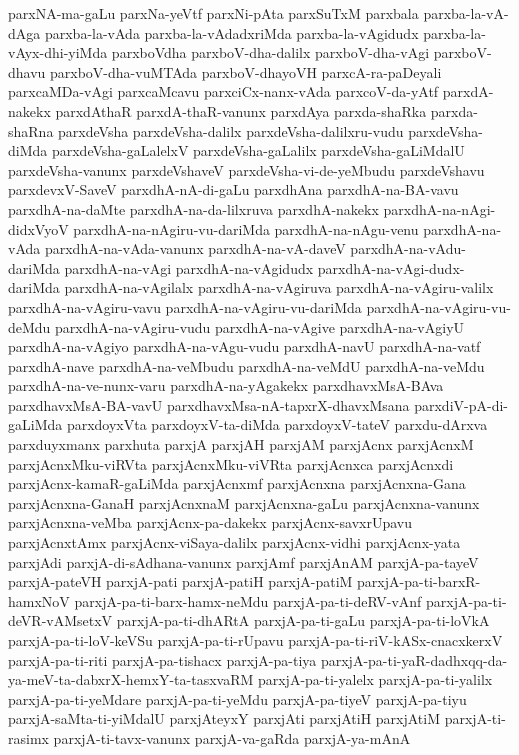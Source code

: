 {parxNA-ma-gaLu
parxNa-yeVtf
parxNi-pAta
parxSuTxM
parxbala
parxba-la-vA-dAga
parxba-la-vAda
parxba-la-vAdadxriMda
parxba-la-vAgidudx
parxba-la-vAyx-dhi-yiMda
parxboVdha
parxboV-dha-dalilx
parxboV-dha-vAgi
parxboV-dhavu
parxboV-dha-vuMTAda
parxboV-dhayoVH
parxcA-ra-paDeyali
parxcaMDa-vAgi
parxcaMcavu
parxciCx-nanx-vAda
parxcoV-da-yAtf
parxdA-nakekx
parxdAthaR
parxdA-thaR-vanunx
parxdAya
parxda-shaRka
parxda-shaRna
parxdeVsha
parxdeVsha-dalilx
parxdeVsha-dalilxru-vudu
parxdeVsha-diMda
parxdeVsha-gaLalelxV
parxdeVsha-gaLalilx
parxdeVsha-gaLiMdalU
parxdeVsha-vanunx
parxdeVshaveV
parxdeVsha-vi-de-yeMbudu
parxdeVshavu
parxdevxV-SaveV
parxdhA-nA-di-gaLu
parxdhAna
parxdhA-na-BA-vavu
parxdhA-na-daMte
parxdhA-na-da-lilxruva
parxdhA-nakekx
parxdhA-na-nAgi-didxVyoV
parxdhA-na-nAgiru-vu-dariMda
parxdhA-na-nAgu-venu
parxdhA-na-vAda
parxdhA-na-vAda-vanunx
parxdhA-na-vA-daveV
parxdhA-na-vAdu-dariMda
parxdhA-na-vAgi
parxdhA-na-vAgidudx
parxdhA-na-vAgi-dudx-dariMda
parxdhA-na-vAgilalx
parxdhA-na-vAgiruva
parxdhA-na-vAgiru-valilx
parxdhA-na-vAgiru-vavu
parxdhA-na-vAgiru-vu-dariMda
parxdhA-na-vAgiru-vu-deMdu
parxdhA-na-vAgiru-vudu
parxdhA-na-vAgive
parxdhA-na-vAgiyU
parxdhA-na-vAgiyo
parxdhA-na-vAgu-vudu
parxdhA-navU
parxdhA-na-vatf
parxdhA-nave
parxdhA-na-veMbudu
parxdhA-na-veMdU
parxdhA-na-veMdu
parxdhA-na-ve-nunx-varu
parxdhA-na-yAgakekx
parxdhavxMsA-BAva
parxdhavxMsA-BA-vavU
parxdhavxMsa-nA-tapxrX-dhavxMsana
parxdiV-pA-di-gaLiMda
parxdoyxVta
parxdoyxV-ta-diMda
parxdoyxV-tateV
parxdu-dArxva
parxduyxmanx
parxhuta
parxjA
parxjAH
parxjAM
parxjAcnx
parxjAcnxM
parxjAcnxMku-viRVta
parxjAcnxMku-viVRta
parxjAcnxca
parxjAcnxdi
parxjAcnx-kamaR-gaLiMda
parxjAcnxmf
parxjAcnxna
parxjAcnxna-Gana
parxjAcnxna-GanaH
parxjAcnxnaM
parxjAcnxna-gaLu
parxjAcnxna-vanunx
parxjAcnxna-veMba
parxjAcnx-pa-dakekx
parxjAcnx-savxrUpavu
parxjAcnxtAmx
parxjAcnx-viSaya-dalilx
parxjAcnx-vidhi
parxjAcnx-yata
parxjAdi
parxjA-di-sAdhana-vanunx
parxjAmf
parxjAnAM
parxjA-pa-tayeV
parxjA-pateVH
parxjA-pati
parxjA-patiH
parxjA-patiM
parxjA-pa-ti-barxR-hamxNoV
parxjA-pa-ti-barx-hamx-neMdu
parxjA-pa-ti-deRV-vAnf
parxjA-pa-ti-deVR-vAMsetxV
parxjA-pa-ti-dhARtA
parxjA-pa-ti-gaLu
parxjA-pa-ti-loVkA
parxjA-pa-ti-loV-keVSu
parxjA-pa-ti-rUpavu
parxjA-pa-ti-riV-kASx-cnacxkerxV
parxjA-pa-ti-riti
parxjA-pa-tishacx
parxjA-pa-tiya
parxjA-pa-ti-yaR-dadhxqq-da-ya-meV-ta-dabxrX-hemxY-ta-tasxvaRM
parxjA-pa-ti-yalelx
parxjA-pa-ti-yalilx
parxjA-pa-ti-yeMdare
parxjA-pa-ti-yeMdu
parxjA-pa-tiyeV
parxjA-pa-tiyu
parxjA-saMta-ti-yiMdalU
parxjAteyxY
parxjAti
parxjAtiH
parxjAtiM
parxjA-ti-rasimx
parxjA-ti-tavx-vanunx
parxjA-va-gaRda
parxjA-ya-mAnA
}
